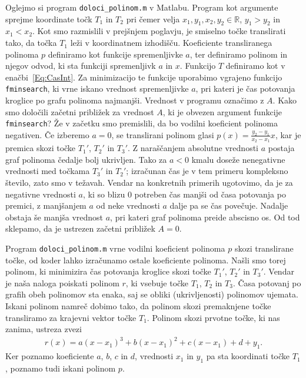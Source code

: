\documentclass[a4paper]{article}
\begin{document}
Oglejmo si program \texttt{doloci\_polinom.m} v Matlabu.
Program kot argumente sprejme koordinate točk $T_1$ in $T_2$ pri čemer velja $x_1, y_1, x_2, y_2 \in \mathbb{R}$, $y_1 > y_2$ in $x_1 < x_2$. Kot smo razmislili v prejšnjem poglavju, je smiselno točke translirati tako, da točka $T_1$ leži v koordinatnem izhodišču. Koeficiente transliranega polinoma $p$ definiramo kot funkcije spremenljivke $a$, ter definiramo polinom in njegov odvod, ki sta funkciji spremenljivk $a$ in $x$. Funkcijo $T$ definiramo kot v enačbi~\eqref{Eq:CasInt}. Za minimizacijo te funkcije uporabimo vgrajeno funkcijo \texttt{fminsearch}, ki vrne iskano vrednost spremenljivke $a$, pri kateri je čas potovanja kroglice po grafu polinoma najmanjši. Vrednost v programu označimo z $A$.
Kako smo določili začetni približek za vrednost $A$, ki je obvezen argument funkcije \texttt{fminsearch}? Že v začetku smo premislili, da bo vodilni koeficient polinoma negativen. Če izberemo $a=0$, se translirani polinom glasi $p(x) = \frac{y_2-y_1}{x_2-x_1} x$, kar je premica skozi točke $T_{1}'$, $T_{2}'$ in $T_{3}'$. Z naraščanjem absolutne vrednosti $a$ postaja graf polinoma čedalje bolj ukrivljen. Tako za $a<0$ kmalu doseže nenegativne vrednosti med točkama $T_{3}'$ in $T_{2}'$; izračunan čas je v tem primeru kompleksno število, zato smo v težavah. Vendar na konkretnih primerih ugotovimo, da je za negativne vrednosti $a$, ki so blizu $0$ potreben čas manjši od časa potovanja po premici, z manjšanjem $a$ od neke vrednosti $a$ dalje pa se čas povečuje. Nadalje obstaja še manjša vrednost $a$, pri kateri graf polinoma preide abscisno os. Od tod sklepamo, da je ustrezen začetni približek $A=0$.

Program \texttt{doloci\_polinom.m} vrne vodilni koeficient polinoma $p$ skozi translirane točke, od koder lahko izračunamo ostale koeficiente polinoma. 
Našli smo torej polinom, ki minimizira čas potovanja kroglice skozi točke $T_{1}'$, $T_{2}'$ in $T_{3}'$. Vendar je naša naloga poiskati polinom $r$, ki vsebuje točke $T_1$, $T_2$ in $T_3$. Časa potovanj po grafih obeh polinomov sta enaka, saj se obliki (ukrivljenosti) polinomov ujemata. Iskani polinom namreč dobimo tako, da polinom skozi premaknjene točke transliramo za krajevni vektor točke $T_1$.
Polinom skozi prvotne točke, ki nas zanima, ustreza zvezi
\begin{align}
\label{Eq:r(x)}
r(x) = a(x-x_1)^3 + b(x-x_1)^2 + c(x-x_1) + d + y_1.
\end{align}
Ker poznamo koeficiente $a$, $b$, $c$ in $d$, vrednosti $x_1$ in $y_1$ pa sta koordinati točke $T_1$, poznamo tudi iskani polinom $p$.
\end{document}
